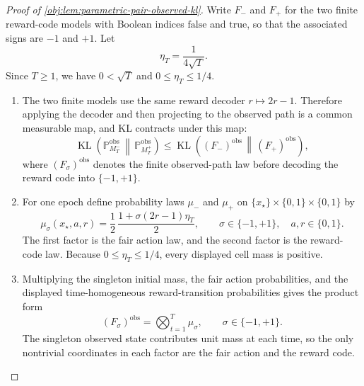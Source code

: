 \documentclass[11pt]{article}
\begin{document}
\begin{proof}[Proof of \cref{obj:lem:parametric-pair-observed-kl}]
Write \(F_{-}\) and \(F_{+}\) for the two finite reward-code models with Boolean indices
\(\mathrm{false}\) and \(\mathrm{true}\), so that the associated signs are \(-1\) and \(+1\).  Let
\[
        \eta_T=\frac{1}{4\sqrt T}.
\]
Since \(T\ge 1\), we have \(0<\sqrt T\) and \(0\le \eta_T\le 1/4\).

\begin{enumerate}
\item
The two finite models use the same reward decoder \(r\mapsto 2r-1\).  Therefore applying the decoder
and then projecting to the observed path is a common measurable map, and KL contracts under this map:
\[
\operatorname{KL}\!\left(
\mathbb P^{\mathrm{obs}}_{M_T^-}
\,\middle\|\,
\mathbb P^{\mathrm{obs}}_{M_T^+}
\right)
\le
\operatorname{KL}\!\left(
(F_-)^{\mathrm{obs}}
\,\middle\|\,
(F_+)^{\mathrm{obs}}
\right),
\]
where \((F_\sigma)^{\mathrm{obs}}\) denotes the finite observed-path law before decoding the reward
code into \(\{-1,+1\}\). %

\item
For one epoch define probability laws \(\mu_{-}\) and \(\mu_{+}\) on
\(\{x_\star\}\times\{0,1\}\times\{0,1\}\) by
\[
\mu_\sigma(x_\star,a,r)
=
\frac12\,
\frac{1+\sigma(2r-1)\eta_T}{2},
\qquad
\sigma\in\{-1,+1\},\quad a,r\in\{0,1\}.
\]
The first factor is the fair action law, and the second factor is the reward-code law.  Because
\(0\le \eta_T\le 1/4\), every displayed cell mass is positive. %

\item
Multiplying the singleton initial mass, the fair action probabilities, and the displayed
time-homogeneous reward-transition probabilities gives the product form
\[
(F_\sigma)^{\mathrm{obs}}
=
\bigotimes_{t=1}^{T}\mu_\sigma,
\qquad \sigma\in\{-1,+1\}.
\]
The singleton observed state contributes unit mass at each time, so the only nontrivial coordinates in
each factor are the fair action and the reward code. %


\end{enumerate}
\end{proof}
\end{document}
